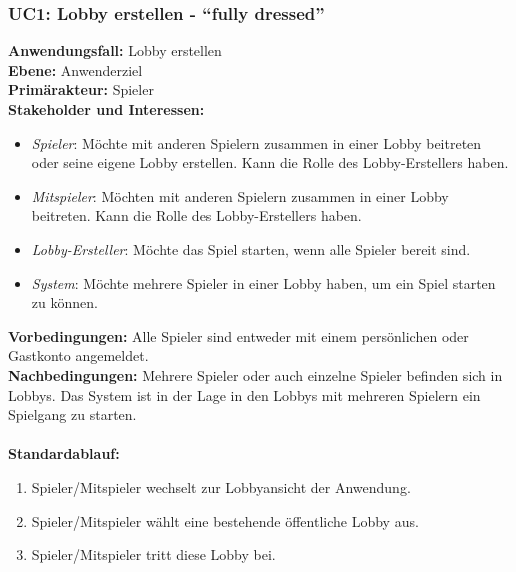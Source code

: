 \documentclass[11pt,ngerman]{article}
\newcommand{\quotes}[1]{``#1''}
\begin{document}
       \subsubsection{UC1: Lobby erstellen - \quotes{fully dressed}}
            \begin{tcolorbox}[enhanced, breakable, sharp corners, width=\dimexpr\textwidth-15mm\relax ,enlarge left by=10mm ,fontupper=\linespread{1.1}\selectfont, boxrule=1pt, title={UC1: Lobby erstellen}, colback=white, colframe=gray!22, coltitle=black]

                \textbf{Anwendungsfall:} Lobby erstellen \\
                \textbf{Ebene:} Anwenderziel \\
                \textbf{Primärakteur:} Spieler \\
                \textbf{Stakeholder und Interessen:}
                \begin{itemize}
                    \item \textit{Spieler}: Möchte mit anderen Spielern zusammen in einer Lobby beitreten oder seine eigene Lobby erstellen. Kann die Rolle des Lobby-Erstellers haben.
                    \item \textit{Mitspieler}: Möchten mit anderen Spielern zusammen in einer Lobby beitreten. Kann die Rolle des Lobby-Erstellers haben.
                    \item \textit{Lobby-Ersteller}:  Möchte das Spiel starten, wenn alle Spieler bereit sind.
                    \item \textit{System}: Möchte mehrere Spieler in einer Lobby haben, um ein Spiel starten zu können.
                \end{itemize}
                \textbf{Vorbedingungen:} Alle Spieler sind entweder mit einem persönlichen oder Gastkonto angemeldet.\\
                \textbf{Nachbedingungen:} Mehrere Spieler oder auch einzelne Spieler befinden sich in Lobbys. Das System ist in der Lage in den Lobbys mit mehreren Spielern ein Spielgang zu starten. \\
                \\  \textbf{Standardablauf:}
                \begin{enumerate}
                    \item Spieler/Mitspieler wechselt zur Lobbyansicht der Anwendung.
                    \item Spieler/Mitspieler wählt eine bestehende öffentliche Lobby aus.
                    \item Spieler/Mitspieler tritt diese Lobby bei.

\end{enumerate}
\end{tcolorbox}
\end{document}
